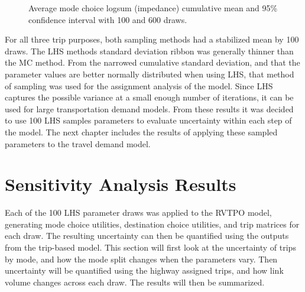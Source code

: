 \documentclass[
  letterpaper,
  number,
  review,
  3p]{elsarticle}
\begin{document}
\begin{sidewaysfigure}

\begin{minipage}{\linewidth}



\end{minipage}%
\newline
\begin{minipage}{\linewidth}



\end{minipage}%

\caption{\label{fig-cm}Average mode choice logsum (impedance) cumulative
mean and 95\% confidence interval with 100 and 600 draws.}

\end{sidewaysfigure}%

For all three trip purposes, both sampling methods had a stabilized mean
by 100 draws. The LHS methods standard deviation ribbon was generally
thinner than the MC method. From the narrowed cumulative standard
deviation, and that the parameter values are better normally distributed
when using LHS, that method of sampling was used for the assignment
analysis of the model. Since LHS captures the possible variance at a
small enough number of iterations, it can be used for large
transportation demand models. From these results it was decided to use
100 LHS samples parameters to evaluate uncertainty within each step of
the model. The next chapter includes the results of applying these
sampled parameters to the travel demand model.


\section{Sensitivity Analysis Results}\label{sec-results}

Each of the 100 LHS parameter draws was applied to the RVTPO model,
generating mode choice utilities, destination choice utilities, and trip
matrices for each draw. The resulting uncertainty can then be quantified
using the outputs from the trip-based model. This section will first
look at the uncertainty of trips by mode, and how the mode split changes
when the parameters vary. Then uncertainty will be quantified using the
highway assigned trips, and how link volume changes across each draw.
The results will then be summarized.
\end{document}
